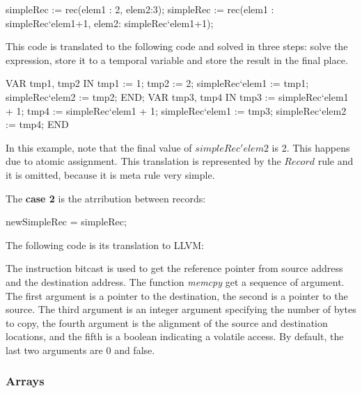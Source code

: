 \begin{pascalcode}
simpleRec := rec(elem1 : 2, elem2:3);
simpleRec := rec(elem1 : simpleRec`elem1+1, elem2: simpleRec`elem1+1);
\end{pascalcode}

This code is translated to the following code and solved in three steps: solve
the expression, store it to a temporal variable and  store the result in the
final place.

\begin{pascalcode}
VAR tmp1, tmp2 IN
tmp1 := 1;
tmp2 := 2;
simpleRec`elem1 := tmp1;
simpleRec`elem2 := tmp2;
END;
VAR tmp3, tmp4 IN
tmp3 := simpleRec`elem1 + 1;
tmp4 := simpleRec`elem1 + 1;
simpleRec`elem1 := tmp3;
simpleRec`elem2 := tmp4;
END
\end{pascalcode}

In this example, note that the final value of $simpleRec'elem2$ is 2. This 
happens due to atomic assignment. This translation is represented by the 
$Record$ rule and it is omitted, because it is meta rule very simple.

The \textbf{case 2} is the atrribution between records:

\begin{pascalcode}
  newSimpleRec = simpleRec;
\end{pascalcode}

The following code is its translation to LLVM:


The instruction bitcast is used to get the reference pointer from source address 
and the destination address. The function \textit{memcpy} get a sequence of argument.
The first argument is a pointer to the destination, the second is a pointer to the source.
The third argument is an integer argument specifying the number of bytes to copy, the
fourth argument is the alignment of the source and destination locations, and the fifth
is a boolean indicating a volatile access. By default, the last two arguments are 0 and false.



\subsubsection{Arrays}

